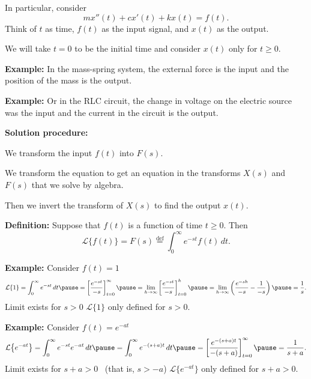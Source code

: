 \documentclass[10pt,aspectratio=169]{beamer}
\begin{document}
\begin{frame}
In particular, consider
\[
m x''(t) + c x'(t) + k x(t) = f(t) .
\]
Think of $t$ as time, $f(t)$ as the input signal, and $x(t)$ as the output.

\medskip
\pause

We will take $t=0$ to be the initial time and consider $x(t)$
only for $t \geq 0$.

\medskip
\pause

\textbf{Example:} In the mass-spring system, the external force is the input and
the position of the mass is the output.

\medskip
\pause

\textbf{Example:}
Or in the RLC circuit, the change in voltage on the electric source
was the input and the current in the circuit is the output.

\medskip
\pause

\textbf{Solution procedure:}

We transform the input $f(t)$ into $F(s)$.

\medskip
\pause

We transform the equation to get an equation in the transforms $X(s)$ and $F(s)$
that we solve by algebra.

\medskip
\pause

Then we invert the transform of $X(s)$ to find the output $x(t)$.

\end{frame}

\begin{frame}
\textbf{Definition:}  Suppose that $f(t)$ is a function of time $t \geq 0$.
Then
\[
\mathcal{L} \bigl\{ f(t) \bigr\} =
F(s) \overset{\text{def}}{=} \int_0^\infty e^{-st} f(t) \, dt .
\]
\pause

\textbf{Example:}
Consider $f(t) = 1$
\begin{equation*}
\mathcal{L} \{1\} = \int_0^\infty e^{-st} \, dt
\pause
=
\left[ \frac{e^{-st}}{-s} \right]_{t=0}^\infty
\pause
=
\lim_{h\to\infty}
\left[ \frac{e^{-st}}{-s} \right]_{t=0}^h
\pause
=
\lim_{h\to\infty}
\left( \frac{e^{-sh}}{-s} - \frac{1}{-s} \right)
\pause
= \frac{1}{s} .
\end{equation*}
Limit exists for $s > 0$
\pause
\wthus
$\mathcal{L} \{1\}$ only defined for $s > 0$.

\medskip
\pause

\textbf{Example:}
Consider
$f(t) = e^{-at}$
\begin{equation*}
\mathcal{L} \bigl\{e^{-at}\bigr\}
= \int_0^\infty e^{-st} e^{-at} \, dt
\pause
= \int_0^\infty e^{-(s+a)t} \, dt
\pause
=
\left[ \frac{e^{-(s+a)t}}{-(s+a)} \right]_{t=0}^\infty
\pause
= \frac{1}{s+a} .
\end{equation*}
Limit exists for $s+a > 0$  ~(that is, $s > -a$)
\pause
\wthus
$\mathcal{L} \bigl\{e^{-at}\bigr\}$ only defined for $s+a > 0$.

\end{frame}
\end{document}
